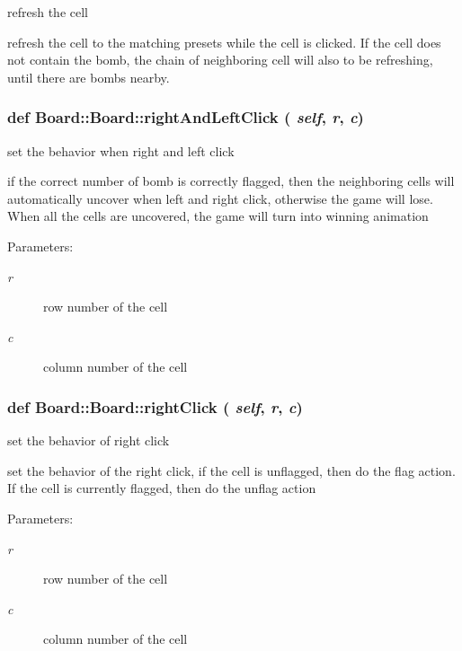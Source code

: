 refresh the cell 

refresh the cell to the matching presets while the cell is clicked. If the cell does not contain the bomb, the chain of neighboring cell will also to be refreshing, until there are bombs nearby. 
\subsubsection{\setlength{\rightskip}{0pt plus 5cm}def Board::Board::right\-And\-Left\-Click ( {\em self},  {\em r},  {\em c})}\label{classBoard_1_1Board_57d32ad131dd46505655d88ab8893d1e}


set the behavior when right and left click 

if the correct number of bomb is correctly flagged, then the neighboring cells will automatically uncover when left and right click, otherwise the game will lose. When all the cells are uncovered, the game will turn into winning animation \begin{Desc}
\item[Parameters:]
\begin{description}
\item[{\em r}]row number of the cell \item[{\em c}]column number of the cell \end{description}
\end{Desc}
\subsubsection{\setlength{\rightskip}{0pt plus 5cm}def Board::Board::right\-Click ( {\em self},  {\em r},  {\em c})}\label{classBoard_1_1Board_4e5c8db005467eb4f4bad00f0cc8020f}


set the behavior of right click 

set the behavior of the right click, if the cell is unflagged, then do the flag action. If the cell is currently flagged, then do the unflag action \begin{Desc}
\item[Parameters:]
\begin{description}
\item[{\em r}]row number of the cell \item[{\em c}]column number of the cell \end{description}
\end{Desc}
